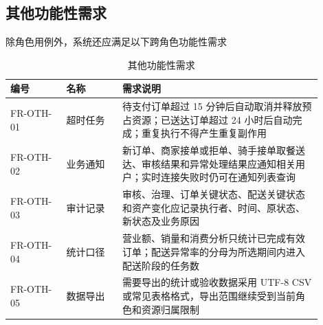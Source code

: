 \subsection{其他功能性需求}

除角色用例外，系统还应满足以下跨角色功能性需求

\begin{longtable}{|L{0.16\linewidth}|L{0.16\linewidth}|L{0.58\linewidth}|}
\caption{其他功能性需求}\label{tab:other-functional}\\ \hline
\textbf{编号} & \textbf{名称} & \textbf{需求说明} \\ \hline
FR-OTH-01 & 超时任务 & 待支付订单超过 15 分钟后自动取消并释放预占资源；已送达订单超过 24 小时后自动完成；重复执行不得产生重复副作用 \\ \hline
FR-OTH-02 & 业务通知 & 新订单、商家接单或拒单、骑手接单取餐送达、审核结果和异常处理结果应通知相关用户；实时连接失败时仍可在通知列表查询 \\ \hline
FR-OTH-03 & 审计记录 & 审核、治理、订单关键状态、配送关键状态和资产变化应记录执行者、时间、原状态、新状态及业务原因 \\ \hline
FR-OTH-04 & 统计口径 & 营业额、销量和消费分析只统计已完成有效订单；配送异常率的分母为所选期间内进入配送阶段的任务数 \\ \hline
FR-OTH-05 & 数据导出 & 需要导出的统计或验收数据采用 UTF-8 CSV 或常见表格格式，导出范围继续受到当前角色和资源归属限制 \\ \hline
\end{longtable}
